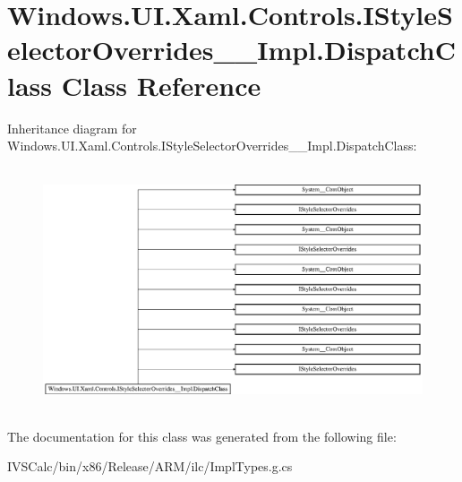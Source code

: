 \hypertarget{class_windows_1_1_u_i_1_1_xaml_1_1_controls_1_1_i_style_selector_overrides_____impl_1_1_dispatch_class}{}\section{Windows.\+U\+I.\+Xaml.\+Controls.\+I\+Style\+Selector\+Overrides\+\_\+\+\_\+\+Impl.\+Dispatch\+Class Class Reference}
\label{class_windows_1_1_u_i_1_1_xaml_1_1_controls_1_1_i_style_selector_overrides_____impl_1_1_dispatch_class}
Inheritance diagram for Windows.\+U\+I.\+Xaml.\+Controls.\+I\+Style\+Selector\+Overrides\+\_\+\+\_\+\+Impl.\+Dispatch\+Class\+:\begin{figure}[H]
\begin{center}
\leavevmode
\includegraphics[height=7.213115cm]{class_windows_1_1_u_i_1_1_xaml_1_1_controls_1_1_i_style_selector_overrides_____impl_1_1_dispatch_class}
\end{center}
\end{figure}


The documentation for this class was generated from the following file\+:\begin{DoxyCompactItemize}
\item 
I\+V\+S\+Calc/bin/x86/\+Release/\+A\+R\+M/ilc/Impl\+Types.\+g.\+cs\end{DoxyCompactItemize}
